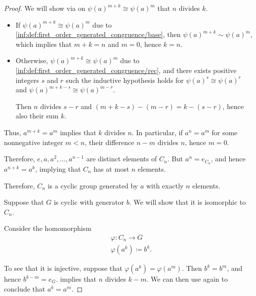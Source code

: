\begin{proof}
  We will show via  on \( \psi(a)^{m + k} \cong \psi(a)^m \) that \( n \) divides \( k \).
  \begin{itemize}
    \item If \( \psi(a)^{m + k} \cong \psi(a)^m \) due to \ref{inf:def:first_order_generated_congruence/base}, then \( \psi(a)^{m + k} \sim \psi(a)^m \), which implies that \( m + k = n \) and \( m = 0 \), hence \( k = n \).

    \item Otherwise, \( \psi(a)^{m + k} \cong \psi(a)^m \) due to \ref{inf:def:first_order_generated_congruence/rec}, and there exists positive integers \( s \) and \( r \) such the inductive hypothesis holds for \( \psi(a)^s \cong \psi(a)^r \) and \( \psi(a)^{m + k - s} \cong \psi(a)^{m - r} \).

    Then \( n \) divides \( s - r \) and \( (m + k - s) - (m - r) = k - (s - r) \), hence also their sum \( k \).
  \end{itemize}

  Thus, \( a^{m + k} = a^m \) implies that \( k \) divides \( n \). In particular, if \( a^n = a^m \) for some nonnegative integer \( m < n \), their difference \( n - m \) divides \( n \), hence \( m = 0 \).

  Therefore, \( e, a, a^2, \ldots, a^{n - 1} \) are distinct elements of \( C_n \). But \( a^n = e_{C_n} \), and hence \( a^{n+k} = a^k \), implying that \( C_n \) has at most \( n \) elements.

  Therefore, \( C_n \) is a cyclic group generated by \( a \) with exactly \( n \) elements.

  \SufficiencySubProof* Suppose that \( G \) is cyclic with generator \( b \). We will show that it is isomorphic to \( C_n \).

  Consider the homomorphism
  \begin{equation*}
    \begin{aligned}
      &\varphi: C_n \to G \\
      &\varphi(a^k) \coloneqq b^k.
    \end{aligned}
  \end{equation*}

  To see that it is injective, suppose that \( \varphi(a^k) = \varphi(a^m) \). Then \( b^k = b^m \), and hence \( b^{k-m} = e_G \).  implies that \( n \) divides \( k - m \). We can then use  again to conclude that \( a^k = a^m \).


\end{proof}
